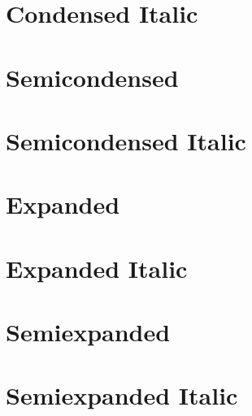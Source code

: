 \documentclass{article}
\begin{document}
{\jCond\lipsum[7]}

\section*{Condensed Italic}

{\jCondItalic\lipsum[8]}

\section*{Semicondensed}

{\jSmCond\lipsum[9]}

\section*{Semicondensed Italic}

{\jSmCondItalic\lipsum[9]}

\section*{Expanded}

{\jExp\lipsum[10]}

\section*{Expanded Italic}

{\jExpItalic\lipsum[11]}

\section*{Semiexpanded}

{\jSmExp\lipsum[12]}

\section*{Semiexpanded Italic}

{\jSmExpItalic\lipsum[12]}
\end{document}
